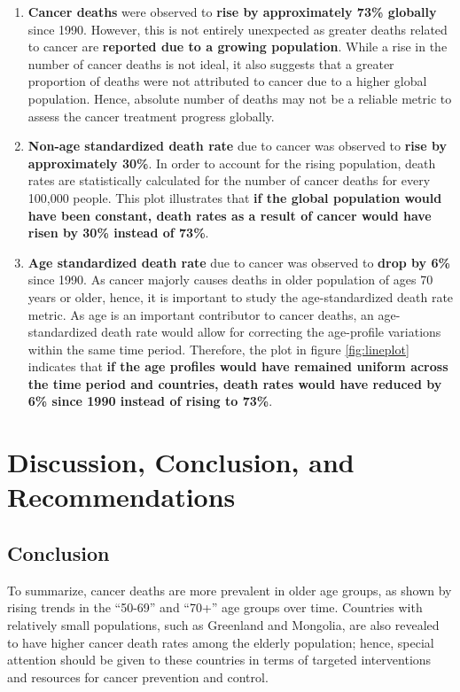 \documentclass[11pt,a4paper,]{article}
\begin{document}
\begin{enumerate}
\def\labelenumi{\arabic{enumi}.}
\item
  \textbf{Cancer deaths} were observed to \textbf{rise by approximately 73\% globally} since 1990. However, this is not entirely unexpected as greater deaths related to cancer are \textbf{reported due to a growing population}. While a rise in the number of cancer deaths is not ideal, it also suggests that a greater proportion of deaths were not attributed to cancer due to a higher global population. Hence, absolute number of deaths may not be a reliable metric to assess the cancer treatment progress globally.
\item
  \textbf{Non-age standardized death rate} due to cancer was observed to \textbf{rise by approximately 30\%}. In order to account for the rising population, death rates are statistically calculated for the number of cancer deaths for every 100,000 people. This plot illustrates that \textbf{if the global population would have been constant, death rates as a result of cancer would have risen by 30\% instead of 73\%}.
\item
  \textbf{Age standardized death rate} due to cancer was observed to \textbf{drop by 6\%} since 1990. As cancer majorly causes deaths in older population of ages 70 years or older, hence, it is important to study the age-standardized death rate metric. As age is an important contributor to cancer deaths, an age-standardized death rate would allow for correcting the age-profile variations within the same time period. Therefore, the plot in figure \ref{fig:lineplot} indicates that \textbf{if the age profiles would have remained uniform across the time period and countries, death rates would have reduced by 6\% since 1990 instead of rising to 73\%}.
\end{enumerate}

\hypertarget{discussion-conclusion-and-recommendations}{%
\section{Discussion, Conclusion, and Recommendations}\label{discussion-conclusion-and-recommendations}}

\hypertarget{conclusion}{%
\subsection{Conclusion}\label{conclusion}}

To summarize, cancer deaths are more prevalent in older age groups, as shown by rising trends in the ``50-69'' and ``70+'' age groups over time. Countries with relatively small populations, such as Greenland and Mongolia, are also revealed to have higher cancer death rates among the elderly population; hence, special attention should be given to these countries in terms of targeted interventions and resources for cancer prevention and control.
\end{document}
